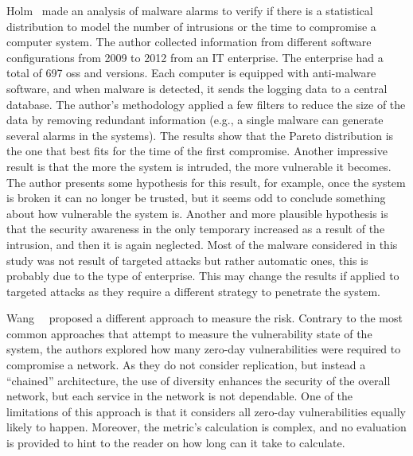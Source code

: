 Holm~\cite{Holm:2014} made an analysis of malware alarms to verify if there is a statistical distribution to model the number of intrusions or the time to compromise a computer system.
The author collected information from different software configurations from 2009 to 2012 from an IT enterprise.
The enterprise had a total of 697 \glspl{os} and versions.
Each computer is equipped with anti-malware software, and when malware is detected, it sends the logging data to a central database.
The author's methodology applied a few filters to reduce the size of the data by removing redundant information (e.g., a single malware can generate several alarms in the systems).
The results show that the Pareto distribution is the one that best fits for the time of the first compromise.
Another impressive result is that the more the system is intruded, the more vulnerable it becomes. 
The author presents some hypothesis for this result, for example, once the system is broken it can no longer be trusted, but it seems odd to conclude something about how vulnerable the system is. 
Another and more plausible hypothesis is that the security awareness in the only temporary increased as a result of the intrusion, and then it is again neglected.
Most of the malware considered in this study was not result of targeted attacks but rather automatic ones, this is probably due to the type of enterprise. 
This may change the results if applied to targeted attacks as they require a different strategy to penetrate the system.


Wang~\etal{}~\cite{Wang:2014} proposed a different approach to measure the risk. 
Contrary to the most common approaches that attempt to measure the vulnerability state of the system, the authors explored how many zero-day vulnerabilities were required to compromise a network. 
As they do not consider replication, but instead a ``chained'' architecture, the use of diversity enhances the security of the overall network, but each service in the network is not dependable.
One of the limitations of this approach is that it considers all zero-day vulnerabilities equally likely to happen.
Moreover, the metric's calculation is complex, and no evaluation is provided to hint to the reader on how long can it take to calculate.

